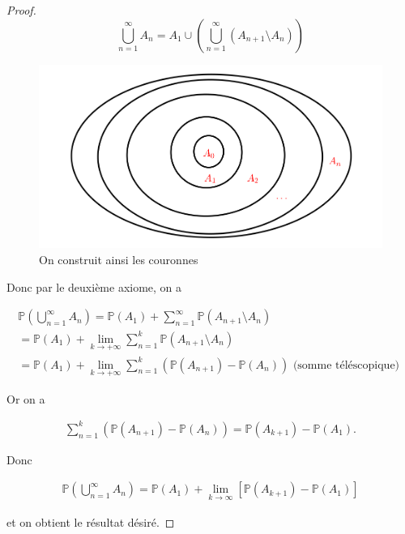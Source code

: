 \documentclass[french]{book}
\theoremstyle{definition}
\theoremstyle{remark}
\begin{document}
\begin{proof}
  \begin{equation*}
    \bigcup _{n=1} ^{\infty} A_n = A_1 \cup \left(\bigcup _{n=1} ^{\infty} (A _{n+1} \setminus A_n)\right)
  \end{equation*}

  \begin{figure}
    \centering
    \includegraphics[scale=0.3]{figures/mesure-suite-ens.png}
    \caption{On construit ainsi les couronnes}
    \label{fig:mesure-suite-ens}
  \end{figure}


  Donc par le deuxième axiome, on a

  \begin{gather*}
    \mathbb{P}( \bigcup _{n=1} ^{\infty} A_n ) = \mathbb{P}( A_1 ) + \sum_{n=1}^{\infty} \mathbb{P}( A _{n+1} \setminus A_n ) \\
    = \mathbb{P}( A_1 ) + \lim_{k \to + \infty} \sum_{n=1}^{k} \mathbb{P}( A _{n+1} \setminus A_n ) \\
    =\mathbb{P}( A_1 ) + \lim_{k \to + \infty} \sum_{n=1}^{k} (\mathbb{P}( A _{n+1} ) - \mathbb{P}( A_n ) ) \text{ (somme téléscopique) }
  \end{gather*}

  Or on a

  \begin{gather*}
    \sum_{n=1}^{k} (\mathbb{P}( A _{n+1} ) - \mathbb{P}( A_n ) )  = \mathbb{P}( A _{k+1} ) - \mathbb{P}( A_1 ).
  \end{gather*}

  Donc

  \begin{gather*}
    \mathbb{P}\left( \bigcup _{n=1} ^{\infty} A_n \right) = \mathbb{P}( A_1 ) + \lim_{k \to \infty} [\mathbb{P}( A _{k+1} ) - \mathbb{P}( A_1 )]
  \end{gather*}

  et on obtient le résultat désiré.
\end{proof}
\end{document}
